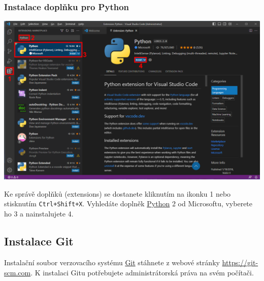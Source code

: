 \documentclass[a4paper,11pt,twoside]{article}
\def\code#1{\textnormal{\texttt{#1}}}
\theoremstyle{red}
\theoremstyle{green}
\begin{document}
\subsubsection{Instalace doplňku pro Python}
    \begin{center}\includegraphics[width=\linewidth]{VSCodeInstallPython.png}\end{center}
    Ke správě doplňků (extensions) se dostanete kliknutím na ikonku {\color{red} 1} nebo stisknutím \code{Ctrl+Shift+X}. 
    Vyhledáte doplněk \href{https://marketplace.visualstudio.com/items?itemName=ms-python.python}{Python} {\color{red} 2} od Microsoftu, vyberete ho {\color{red} 3} a nainstalujete {\color{red} 4}.

\subsection{Instalace Git}
    Instalační soubor verzovacího systému \href{https://git-scm.com}{Git} stáhnete z webové stránky \url{https://git-scm.com}.
    K instalaci Gitu potřebujete administrátorská práva na svém počítači.
    
\end{document}
